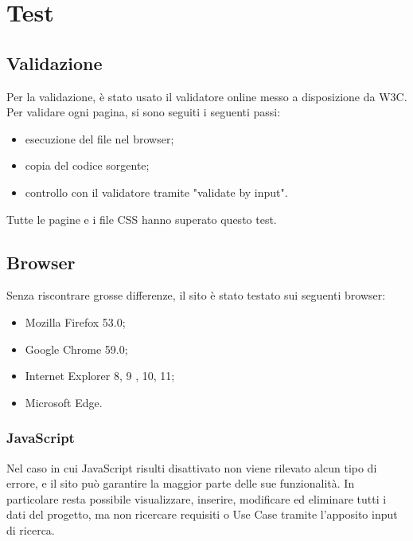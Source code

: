 \section{Test}
\subsection{Validazione}
Per la validazione, è stato usato il validatore online messo a disposizione da W3C. Per validare ogni pagina, si sono seguiti i seguenti passi:
\begin{itemize}
	\item esecuzione del file nel browser;
	\item copia del codice sorgente;
	\item controllo con il validatore tramite "validate by input".
\end{itemize}
Tutte le pagine e i file CSS hanno superato questo test.
\subsection{Browser}
Senza riscontrare grosse differenze, il sito è stato testato sui seguenti browser:
\begin{itemize}
	\item Mozilla Firefox 53.0;
	\item Google Chrome 59.0;
	\item Internet Explorer 8, 9 , 10, 11;
	\item Microsoft Edge.
\end{itemize}
\subsubsection{JavaScript}
Nel caso in cui JavaScript risulti disattivato non viene rilevato alcun tipo di errore, e il sito può garantire la maggior parte delle sue funzionalità. In particolare resta possibile visualizzare, inserire, modificare ed eliminare tutti i dati del progetto, ma non ricercare requisiti o Use Case tramite l'apposito input di ricerca.
